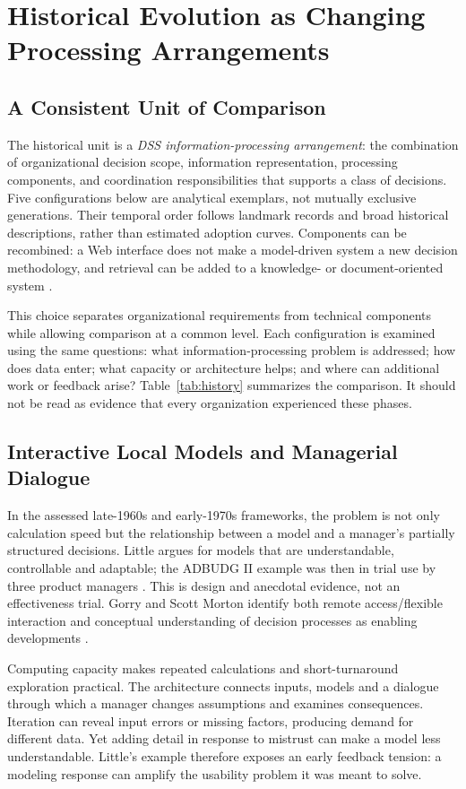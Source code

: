 \documentclass[journal]{IEEEtran}
\begin{document}
\section{Historical Evolution as Changing Processing Arrangements}
\subsection{A Consistent Unit of Comparison}
The historical unit is a \emph{DSS information-processing arrangement}: the combination of organizational decision scope, information representation, processing components, and coordination responsibilities that supports a class of decisions. Five configurations below are analytical exemplars, not mutually exclusive generations. Their temporal order follows landmark records and broad historical descriptions, rather than estimated adoption curves. Components can be recombined: a Web interface does not make a model-driven system a new decision methodology, and retrieval can be added to a knowledge- or document-oriented system \cite{power2004}.

This choice separates organizational requirements from technical components while allowing comparison at a common level. Each configuration is examined using the same questions: what information-processing problem is addressed; how does data enter; what capacity or architecture helps; and where can additional work or feedback arise? Table~\ref{tab:history} summarizes the comparison. It should not be read as evidence that every organization experienced these phases.

\subsection{Interactive Local Models and Managerial Dialogue}
In the assessed late-1960s and early-1970s frameworks, the problem is not only calculation speed but the relationship between a model and a manager's partially structured decisions. Little argues for models that are understandable, controllable and adaptable; the ADBUDG II example was then in trial use by three product managers \cite{little1969}. This is design and anecdotal evidence, not an effectiveness trial. Gorry and Scott Morton identify both remote access/flexible interaction and conceptual understanding of decision processes as enabling developments \cite{gorry1971}.

Computing capacity makes repeated calculations and short-turnaround exploration practical. The architecture connects inputs, models and a dialogue through which a manager changes assumptions and examines consequences. Iteration can reveal input errors or missing factors, producing demand for different data. Yet adding detail in response to mistrust can make a model less understandable. Little's example therefore exposes an early feedback tension: a modeling response can amplify the usability problem it was meant to solve.
\end{document}
